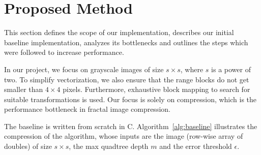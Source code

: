 \section{Proposed Method}\label{sec:yourmethod}

This section defines the scope of our implementation, describes our initial baseline
implementation, analyzes its bottlenecks and outlines the steps which were followed to
increase performance.

 In our project, we focus on grayscale images of size $s \times s$,
where $s$ is a power of two. To simplify vectorization, we
also ensure that the range blocks do not get smaller than $4 \times 4$ pixels.
Furthermore, exhaustive block mapping to search for suitable transformations is
used. Our focus is solely on compression, which is the performance bottleneck in
fractal image compression.


The baseline is written from scratch in C. Algorithm~\ref{alg:baseline} illustrates the compression of the algorithm,
whose inputs are the image (row-wise array of doubles) of size $s \times s$, the max quadtree depth $m$ and the error threshold $\epsilon$.

